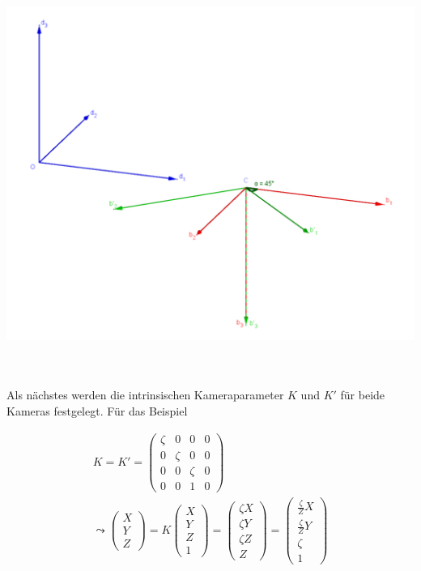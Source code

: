 \begin{minipage}{\linewidth}
	\centering
	\includegraphics[width=1.\linewidth]{images/GrafikHomographieSameC.png}
	\label{fig:Koordinatensysteme2}
\end{minipage}\\ \\

Als nächstes werden die intrinsischen Kameraparameter $K$ und $K'$ für beide Kameras festgelegt. Für das Beispiel

\begin{gather}
K=K'
= 
\begin{pmatrix}
\zeta&0&0&0\\
0&\zeta&0&0\\
0&0&\zeta&0\\
0&0&1&0
\end{pmatrix}\\
\leadsto
\begin{pmatrix}
X\\Y\\Z
\end{pmatrix} = 
K
\begin{pmatrix}
X\\Y\\Z\\1
\end{pmatrix}
=
\begin{pmatrix}
\zeta X\\\zeta Y\\\zeta Z\\Z
\end{pmatrix}
=
\begin{pmatrix}
\frac{\zeta}{Z} X\\\frac{\zeta}{Z} Y\\\zeta\\1
\end{pmatrix}
\end{gather}\\

